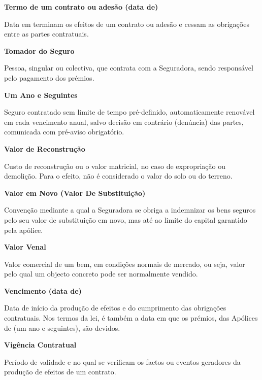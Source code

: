 \begin{description}
\item \textbf{Termo de um contrato ou adesão (data de)}

Data em terminam os efeitos de um contrato ou adesão e cessam as obrigações entre as partes contratuais.
\end{description}

\begin{description}
\item \textbf{Tomador do Seguro}

Pessoa, singular ou colectiva, que contrata com a Seguradora, sendo responsável pelo pagamento dos prémios.
\end{description}

\begin{description}
\item \textbf{Um Ano e Seguintes}

Seguro contratado sem limite de tempo pré-definido, automaticamente renovável em cada vencimento anual, salvo decisão em contrário (denúncia) das partes, comunicada com pré-aviso obrigatório.
\end{description}

\begin{description}
\item \textbf{Valor de Reconstrução}

Custo de reconstrução ou o valor matricial, no caso de expropriação ou demolição. Para o efeito, não é considerado o valor do solo ou do terreno.
\end{description}

\begin{description}
\item \textbf{Valor em Novo (Valor De Substituição)}

Convenção mediante a qual a Seguradora se obriga a indemnizar os bens seguros pelo seu valor de substituição em novo, mas até ao limite do capital garantido pela apólice.
\end{description}

\begin{description}
\item \textbf{Valor Venal}

Valor comercial de um bem, em condições normais de mercado, ou seja, valor pelo qual um objecto concreto pode ser normalmente vendido.
\end{description}

\begin{description}
\item \textbf{Vencimento (data de)}

Data de início da produção de efeitos e do cumprimento das obrigações contratuais. Nos termos da lei, é também a data em que os prémios, das Apólices de (um ano e seguintes), são devidos.
\end{description}

\begin{description}
\item \textbf{Vigência Contratual}

Período de validade e no qual se verificam os factos ou eventos geradores da produção de efeitos de um contrato.
\end{description}


